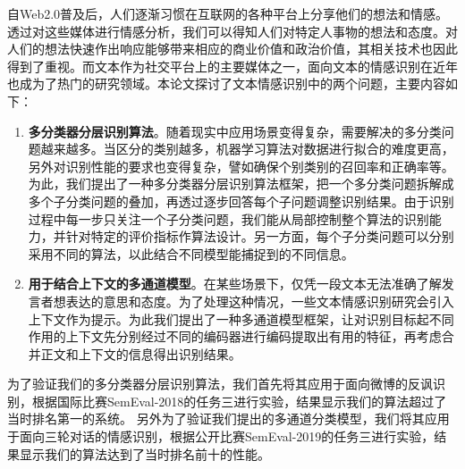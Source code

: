 \begin{cabstract}

自Web2.0普及后，人们逐渐习惯在互联网的各种平台上分享他们的想法和情感。透过对这些媒体进行情感分析，我们可以得知人们对特定人事物的想法和态度。对人们的想法快速作出响应能够带来相应的商业价值和政治价值，其相关技术也因此得到了重视。而文本作为社交平台上的主要媒体之一，面向文本的情感识别在近年也成为了热门的研究领域。本论文探讨了文本情感识别中的两个问题，主要内容如下：

\begin{enumerate}

\item {\bf 多分类器分层识别算法}。随着现实中应用场景变得复杂，需要解决的多分类问题越来越多。当区分的类别越多，机器学习算法对数据进行拟合的难度更高，另外对识别性能的要求也变得复杂，譬如确保个别类别的召回率和正确率等。为此，我们提出了一种多分类器分层识别算法框架，把一个多分类问题拆解成多个子分类问题的叠加，再透过逐步回答每个子问题调整识别结果。由于识别过程中每一步只关注一个子分类问题，我们能从局部控制整个算法的识别能力，并针对特定的评价指标作算法设计。另一方面，每个子分类问题可以分别采用不同的算法，以此结合不同模型能捕捉到的不同信息。

\item {\bf 用于结合上下文的多通道模型}。在某些场景下，仅凭一段文本无法准确了解发言者想表达的意思和态度。为了处理这种情况，一些文本情感识别研究会引入上下文作为提示。为此我们提出了一种多通道模型框架，让对识别目标起不同作用的上下文先分别经过不同的编码器进行编码提取出有用的特征，再考虑合并正文和上下文的信息得出识别结果。

\end{enumerate}

为了验证我们的多分类器分层识别算法，我们首先将其应用于面向微博的反讽识别，根据国际比赛SemEval-2018的任务三进行实验，结果显示我们的算法超过了当时排名第一的系统。
另外为了验证我们提出的多通道分类模型，我们将其应用于面向三轮对话的情感识别，根据公开比赛SemEval-2019的任务三进行实验，结果显示我们的算法达到了当时排名前十的性能。


\end{cabstract}


